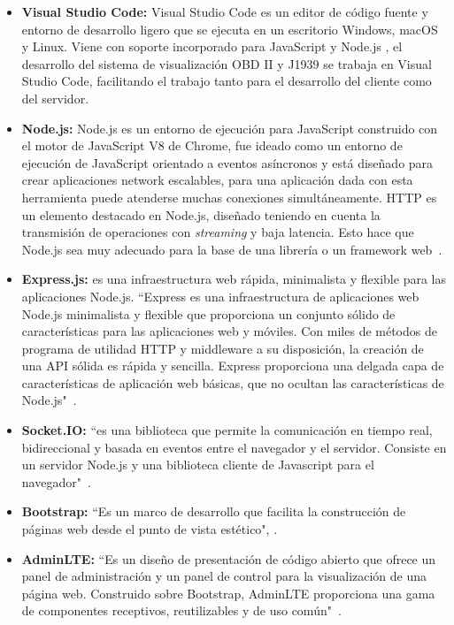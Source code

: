 \begin{itemize}
    \item \textbf{Visual Studio Code:} Visual Studio Code es un editor de código fuente y entorno de desarrollo ligero que se ejecuta en un escritorio Windows, macOS y Linux. 
    Viene con soporte incorporado para JavaScript y  Node.js \cite{vsc}, el desarrollo del sistema de visualización OBD II y J1939 se trabaja en Visual Studio Code, facilitando el trabajo tanto para el desarrollo del cliente como del servidor. 
	\item {\bfseries Node.js: }	Node.js es un entorno de ejecución para JavaScript construido con el motor de JavaScript V8 de Chrome, fue ideado como un entorno de ejecución de JavaScript orientado a eventos asíncronos y está diseñado para crear aplicaciones network escalables, para una aplicación dada con esta herramienta puede atenderse muchas conexiones simultáneamente.
	HTTP es un elemento destacado en Node.js, diseñado teniendo en cuenta la transmisión de operaciones con \textit{streaming} y baja latencia. 
	Esto hace que Node.js sea muy adecuado para la base de una librería o un framework web~\cite{nodejs}.
	\item {\bfseries Express.js: } es una infraestructura web rápida, minimalista y flexible para las aplicaciones Node.js. ``Express es una infraestructura de aplicaciones web Node.js minimalista y flexible que proporciona un conjunto sólido de características para las aplicaciones web y móviles. 	
	Con miles de métodos de programa de utilidad HTTP y middleware a su disposición, la creación de una API sólida es rápida y sencilla. 
	Express proporciona una delgada capa de características de aplicación web básicas, que no ocultan las características de Node.js"~\cite{express}. %
	\item {\bfseries Socket.IO: } ``es una biblioteca que permite la comunicación en tiempo real, bidireccional y basada en eventos entre el navegador y el servidor. 
	Consiste en  un servidor Node.js y una biblioteca cliente de Javascript para el navegador"~\cite{socket}. %
	\item {\bfseries Bootstrap: } ``Es un marco de desarrollo que facilita la construcción de páginas web desde el punto de vista estético", \cite{boot}. %
	\item {\bfseries AdminLTE: } ``Es un diseño de presentación  de código abierto que ofrece un  panel de administración y  un panel de control para la visualización de una página web. 
	Construido sobre Bootstrap, AdminLTE proporciona una gama de componentes receptivos, reutilizables y de uso común"~\cite{admin}. %
	

\end{itemize}
